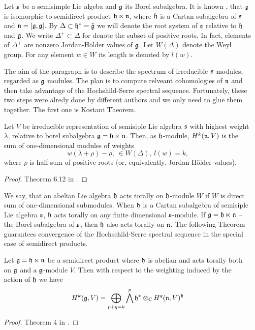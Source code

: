 Let $\mathfrak{s}$ be a semisimple Lie algeba and $\mathfrak{g}$ its Borel subalgebra. It is known
\cite{humphreys}, that $\mathfrak{g}$ is isomorphic to semidirect product $\mathfrak{h} \ltimes \mathfrak{n}$, where
$\mathfrak{h}$ is a Cartan subalgebra of $\mathfrak{s}$ and $\mathfrak{n} = [\mathfrak{g}, \mathfrak{g}]$. By $\Delta \subset \mathfrak{h}^*
= \hat{\mathfrak{g}}$ we will denote the root system of $\mathfrak{s}$ relative to $\mathfrak{h}$ and $\mathfrak{g}$. We write
$\Delta^+ \subset \Delta$ for denote the subset of positive roots. In fact, elements of $\Delta^+$
are nonzero Jordan-H\"older values of $\mathfrak{g}$. Let $W(\Delta)$ denote the Weyl group. For any
element $w\in W$ its length is denoted by $l(w)$. 

The aim of the paragraph is to describe the spectrum of irreducible $\mathfrak{s}$ modules, regarded
as $\mathfrak{g}$ modules. The plan is to compute relveant cohomologies of $\mathfrak{n}$ and then take advantage
of the Hochshild-Serre spectral sequence. Fortunately, these two steps were alredy done by
different authors and we only need to glue them together. The first one is Kostant Theorem.
\begin{theorem}[Kostant]
   Let $V$ be irreducible representation of semisiple Lie algebra $\mathfrak{s}$ with highest weight
   $\lambda$, relative to borel subalgebra $\mathfrak{g} = \mathfrak{h} \ltimes \mathfrak{n}$. Then, as $\mathfrak{h}$-module,
   $H^k(\mathfrak{n}, V)$ is the sum of one-dimensional modules of weights
   \[
       w(\lambda + \rho) - \rho,~\in W(\Delta), ~l(w) = k,
   \]
   where $\rho$ is half-sum of positive roots (or, equivalently, Jordan-H\"older values).
\end{theorem}
\begin{proof}
    Theorem 6.12 in \cite{knapp}.
\end{proof}
We say, that an abelian Lie algebra $\mathfrak{h}$ acts torally on $\mathfrak{h}$-module $W$ if $W$ is direct sum
of one-dimensional submodules. When $\mathfrak{h}$ is a Cartan subalgebra of semisiple Lie algebra
$\mathfrak{s}$, $\mathfrak{h}$ acts torally on any finite dimensional $\mathfrak{s}$-module. If $\mathfrak{g} = \mathfrak{h} \ltimes
\mathfrak{n}$ -- the Borel subalgebra of $\mathfrak{s}$, then $\mathfrak{h}$ also acts torally on $\mathfrak{n}$. The following
Theorem guarantees convergence of the Hochschild-Serre spectral sequence in the special case of
semidirect products.
\begin{theorem}
    Let $\mathfrak{g}=\mathfrak{h}\ltimes\mathfrak{n}$ be a semidirect product where $\mathfrak{h}$ is abelian and acts torally
    both on $\mathfrak{g}$ and a $\mathfrak{g}$-module $V$. Then with respect to the weighting induced by the
    action of $\mathfrak{h}$ we have 
    \begin{equation} \label{t:coll:1}
        H^k(\mathfrak{g}, V) = \bigoplus_{p + q = k} \bigwedge^p\mathfrak{h}^* \otimes_{\mathbb{C}} H^q(\mathfrak{n}, V)^{\mathfrak{h}}
    \end{equation} 
\end{theorem}
\begin{proof}
    Theorem 4 in \cite{coll}. 
\end{proof}

